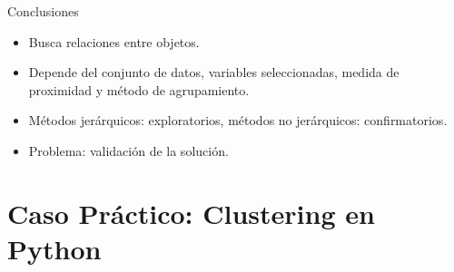 \documentclass[spanish]{beamer}
\begin{document}
\begin{frame}{Conclusiones}
\begin{itemize}
\item Busca relaciones entre objetos.
\item Depende del conjunto de datos, variables seleccionadas, medida de proximidad y método de agrupamiento.
\item Métodos jerárquicos: exploratorios, métodos no jerárquicos: confirmatorios.
\item Problema: validación de la solución.
\end{itemize}
\end{frame}


\section{Caso Práctico: Clustering en Python}
\end{document}

